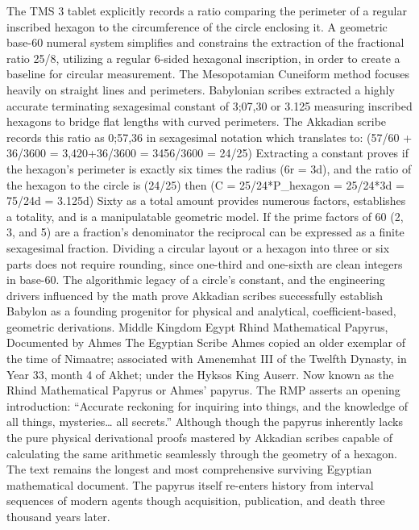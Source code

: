 The TMS 3 tablet explicitly records a ratio comparing the perimeter of a regular inscribed hexagon to the circumference of the circle enclosing it. A geometric base-60 numeral system simplifies and constrains the extraction of the fractional ratio 25/8, utilizing a regular 6-sided hexagonal inscription, in order to create a baseline for circular measurement. The Mesopotamian Cuneiform method focuses heavily on straight lines and perimeters. Babylonian scribes extracted a highly accurate terminating sexagesimal constant of 3;07,30 or 3.125 measuring inscribed hexagons to bridge flat lengths with curved perimeters. The Akkadian scribe records this ratio as 0;57,36 in sexagesimal notation which translates to:
({57}/{60} + {36}/{3600} = 3,420+{36}/{3600} = {3456}/{3600} = {24}/{25})
Extracting a constant proves if the hexagon's perimeter is exactly six times the radius
(6r = 3d), and the ratio of the hexagon to the circle is (24/25)
then
(C = {25}/{24}*P_{hexagon} = {25}/{24}*3d = {75}/{24}d = {3.125d})
Sixty as a total amount provides numerous factors, establishes a totality, and is a manipulatable geometric model. If the prime factors of 60 (2, 3, and 5) are a fraction’s denominator the reciprocal can be expressed as a finite sexagesimal fraction. Dividing a circular layout or a hexagon into three or six parts does not require rounding, since one-third and one-sixth are clean integers in base-60. The algorithmic legacy of a circle’s constant, and the engineering drivers influenced by the math prove Akkadian scribes successfully establish Babylon as a founding progenitor for physical and analytical, coefficient-based, geometric derivations. 
Middle Kingdom Egypt
Rhind Mathematical Papyrus, Documented by Ahmes
The Egyptian Scribe Ahmes copied an older exemplar of the time of Nimaatre; associated with Amenemhat III of the Twelfth Dynasty, in Year 33, month 4 of Akhet; under the Hyksos King Auserr. Now known as the Rhind Mathematical Papyrus or Ahmes’ papyrus. The RMP asserts an opening introduction:
“Accurate reckoning for inquiring into things, and the knowledge of all things, mysteries… all secrets.”
Although though the papyrus inherently lacks the pure physical derivational proofs mastered by Akkadian scribes capable of calculating the same arithmetic seamlessly through the geometry of a hexagon. The text remains the longest and most comprehensive surviving Egyptian mathematical document. The papyrus itself re-enters history from interval sequences of modern agents though acquisition, publication, and death three thousand years later. 

